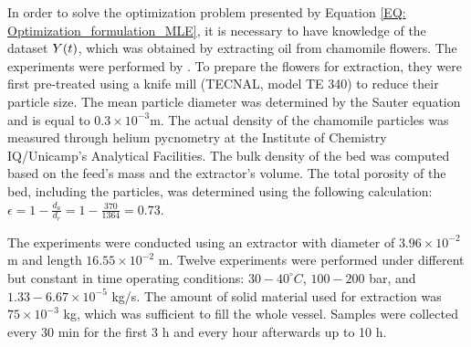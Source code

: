 \documentclass[../Article_Model_Parameters.tex]{subfiles}
\begin{document}
	
	\label{CH: Experiments}
	
	In order to solve the optimization problem presented by Equation \ref{EQ: Optimization_formulation_MLE}, it is necessary to have knowledge of the dataset ${\color{black}Y}(t)$, which was obtained by extracting oil from chamomile flowers. The experiments were performed by \citet{Povh2001}. To prepare the flowers for extraction, they were first pre-treated using a knife mill (TECNAL, model TE 340) to reduce their particle size. The mean
	particle diameter was determined by the Sauter equation and is equal to $0.3\times 10^{-3}$m. The actual density of the chamomile particles was measured through helium pycnometry at the Institute of Chemistry IQ/Unicamp's Analytical Facilities. The bulk density of the bed was computed based on the feed's mass and the extractor's volume. The total porosity of the bed, including the particles, was determined using the following calculation: $\epsilon=1-\frac{d_a}{d_r} = 1-\frac{370}{1364} = 0.73$.
	
	
	The experiments were conducted using an extractor with diameter of $3.96\times 10^{-2}$ m and length $16.55\times 10^{-2}$ m. Twelve experiments were performed under different but constant in time operating conditions: $30-40^\circ C$, $100 - 200$ bar, and $1.33-6.67 \times 10^{-5}$ kg/s. The amount of solid material used for extraction was $75\times 10^{-3}$ kg, which was sufficient to fill the whole vessel. Samples were collected every 30 min for the first 3 h and every hour afterwards up to 10 h. 
	
		
\end{document}
